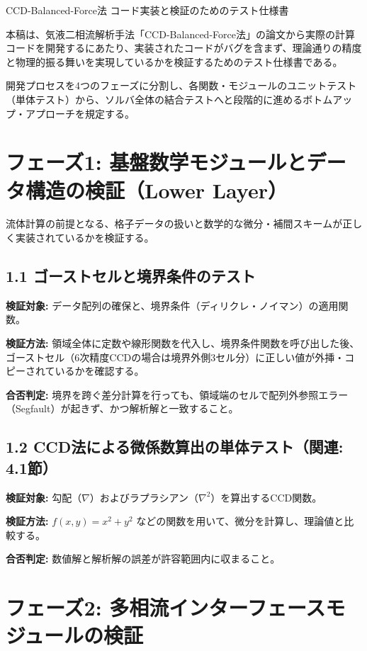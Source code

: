 \documentclass[12pt, a4paper, titlepage]{article}
\begin{document}
\begin{center}
{\LARGE CCD-Balanced-Force法 コード実装と検証のためのテスト仕様書}
\end{center}

\vspace{1em}

本稿は、気液二相流解析手法「CCD-Balanced-Force法」の論文から実際の計算コードを開発するにあたり、実装されたコードがバグを含まず、理論通りの精度と物理的振る舞いを実現しているかを検証するためのテスト仕様書である。

開発プロセスを4つのフェーズに分割し、各関数・モジュールのユニットテスト（単体テスト）から、ソルバ全体の結合テストへと段階的に進めるボトムアップ・アプローチを規定する。

\section*{フェーズ1: 基盤数学モジュールとデータ構造の検証（Lower Layer）}

流体計算の前提となる、格子データの扱いと数学的な微分・補間スキームが正しく実装されているかを検証する。

\subsection*{1.1 ゴーストセルと境界条件のテスト}

\textbf{検証対象:} データ配列の確保と、境界条件（ディリクレ・ノイマン）の適用関数。

\textbf{検証方法:} 領域全体に定数や線形関数を代入し、境界条件関数を呼び出した後、ゴーストセル（6次精度CCDの場合は境界外側3セル分）に正しい値が外挿・コピーされているかを確認する。

\textbf{合否判定:} 境界を跨ぐ差分計算を行っても、領域端のセルで配列外参照エラー（Segfault）が起きず、かつ解析解と一致すること。

\subsection*{1.2 CCD法による微係数算出の単体テスト（関連: 4.1節）}

\textbf{検証対象:} 勾配（$\nabla$）およびラプラシアン（$\nabla^2$）を算出するCCD関数。

\textbf{検証方法:} $f(x,y) = x^2 + y^2$ などの関数を用いて、微分を計算し、理論値と比較する。

\textbf{合否判定:} 数値解と解析解の誤差が許容範囲内に収まること。

\section*{フェーズ2: 多相流インターフェースモジュールの検証}
\end{document}
